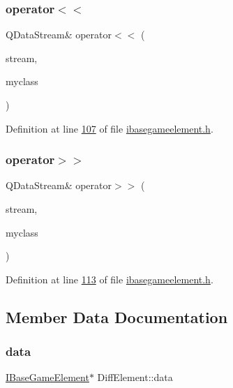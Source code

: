 \subsubsection{\texorpdfstring{operator$<$$<$}{operator<<}}
{\footnotesize\ttfamily Q\+Data\+Stream\& operator$<$$<$ (\begin{DoxyParamCaption}\item[{Q\+Data\+Stream \&}]{stream,  }\item[{const \hyperlink{a00141}{Diff\+Element} \&}]{myclass }\end{DoxyParamCaption})\hspace{0.3cm}{\ttfamily [friend]}}



Definition at line \hyperlink{a00047_source_l00107}{107} of file \hyperlink{a00047_source}{ibasegameelement.\+h}.

\mbox{\label{a00141_ac0d28f7b0a0c877592716bf643a1d8bd}} 
\subsubsection{\texorpdfstring{operator$>$$>$}{operator>>}}
{\footnotesize\ttfamily Q\+Data\+Stream\& operator$>$$>$ (\begin{DoxyParamCaption}\item[{Q\+Data\+Stream \&}]{stream,  }\item[{\hyperlink{a00141}{Diff\+Element} \&}]{myclass }\end{DoxyParamCaption})\hspace{0.3cm}{\ttfamily [friend]}}



Definition at line \hyperlink{a00047_source_l00113}{113} of file \hyperlink{a00047_source}{ibasegameelement.\+h}.



\subsection{Member Data Documentation}
\mbox{\label{a00141_a656245277c76d03d7c20a55c54db6fef}} 
\subsubsection{\texorpdfstring{data}{data}}
{\footnotesize\ttfamily \hyperlink{a00137}{I\+Base\+Game\+Element}$\ast$ Diff\+Element\+::data}



